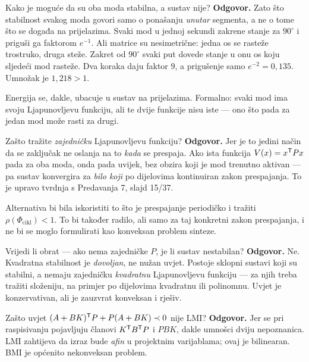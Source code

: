 \begin{pitanje}{Kako je moguće da su oba moda stabilna, a sustav nije?}
\textbf{Odgovor.} Zato što stabilnost svakog moda govori samo o ponašanju
\emph{unutar} segmenta, a ne o tome što se događa na prijelazima. Svaki mod u
jednoj sekundi zakrene stanje za $90^\circ$ i priguši ga faktorom $e^{-1}$. Ali
matrice su nesimetrične: jedna os se rasteže trostruko, druga steže. Zakret od
$90^\circ$ svaki put dovede stanje u onu os koju sljedeći mod rasteže. Dva koraka
daju faktor $9$, a prigušenje samo $e^{-2} = 0{,}135$. Umnožak je $1{,}218 > 1$.

Energija se, dakle, ubacuje u sustav na prijelazima. Formalno: svaki mod ima
svoju Ljapunovljevu funkciju, ali te dvije funkcije nisu iste --- ono što pada za
jedan mod može rasti za drugi.
\end{pitanje}

\begin{pitanje}{Zašto tražite \emph{zajedničku} Ljapunovljevu funkciju?}
\textbf{Odgovor.} Jer je to jedini način da se zaključak ne oslanja na to
\emph{kada} se prespaja. Ako ista funkcija $V(x) = x^{\mathsf{T}} Px$ pada za oba moda,
onda pada uvijek, bez obzira koji je mod trenutno aktivan --- pa sustav
konvergira za \emph{bilo koji} po dijelovima kontinuiran zakon prespajanja. To je
upravo tvrdnja s Predavanja 7, slajd 15/37.

Alternativa bi bila iskoristiti to što je prespajanje periodičko i tražiti
$\rho(\Phi_{\mathrm{cikl}}) < 1$. To bi također radilo, ali samo za taj konkretni
zakon prespajanja, i ne bi se moglo formulirati kao konveksan problem sinteze.
\end{pitanje}

\begin{pitanje}{Vrijedi li obrat --- ako nema zajedničke $P$, je li sustav nestabilan?}
\textbf{Odgovor.} Ne. Kvadratna stabilnost je \emph{dovoljan}, ne nužan uvjet.
Postoje sklopni sustavi koji su stabilni, a nemaju zajedničku \emph{kvadratnu}
Ljapunovljevu funkciju --- za njih treba tražiti složeniju, na primjer po
dijelovima kvadratnu ili polinomnu. Uvjet je konzervativan, ali je zauzvrat
konveksan i rješiv.
\end{pitanje}

\begin{pitanje}{Zašto uvjet $(A+BK)^{\mathsf{T}} P + P(A+BK) \prec 0$ nije LMI?}
\textbf{Odgovor.} Jer se pri raspisivanju pojavljuju članovi $K^{\mathsf{T}} B^{\mathsf{T}} P$
i $PBK$, dakle umnošci dviju nepoznanica. LMI zahtijeva da izraz bude
\emph{afin} u projektnim varijablama; ovaj je bilinearan. BMI je općenito
nekonveksan problem.
\end{pitanje}


